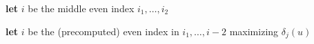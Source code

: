 \documentclass[12pt]{article}
\begin{document}
\begin{Walgo}[ht]{20pt}
  \DontPrintSemicolon
  \Indm
    \Indp
    \BlankLine
    
    \textbf{let} $i$ be the middle even index $i_1,\hdots,i_2$
    
    \textbf{let} $i$ be the (precomputed) even index in $i_1,\hdots,i-2$ maximizing $\delta_j(u)$
    
    \caption{$bdist_k(u,v,i_1,i_2)$}
    \label{alg:bdistk}
\end{Walgo}
\end{document}
